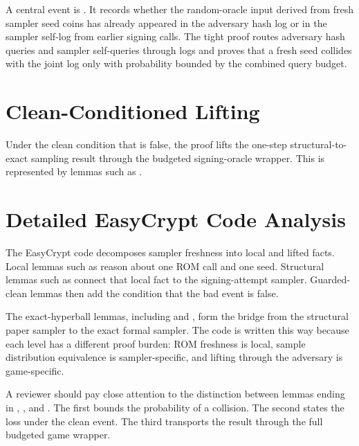 A central event is .  It records whether the
random-oracle input derived from fresh sampler seed coins has already appeared
in the adversary hash log or in the sampler self-log from earlier signing calls.
The tight proof routes adversary hash queries and sampler self-queries through
logs and proves that a fresh seed collides with the joint log only with
probability bounded by the combined query budget.

\section{Clean-Conditioned Lifting}

Under the clean condition that  is false, the
proof lifts the one-step structural-to-exact sampling result through the
budgeted signing-oracle wrapper.  This is represented by lemmas such as
.

\section{Detailed EasyCrypt Code Analysis}

The EasyCrypt code decomposes sampler freshness into local and lifted facts.
Local lemmas such as
 reason about
one ROM call and one seed.  Structural lemmas such as
connect that local fact to the signing-attempt sampler.  Guarded-clean lemmas
then add the condition that the bad event is false.

The exact-hyperball lemmas, including
 and
,
form the bridge from the structural paper sampler to the exact formal sampler.
The code is written this way because each level has a different proof burden:
ROM freshness is local, sample distribution equivalence is sampler-specific,
and lifting through the adversary is game-specific.

A reviewer should pay close attention to the distinction between lemmas ending
in , , and .
The first bounds the probability of a collision.  The second states the loss
under the clean event.  The third transports the result through the full
budgeted game wrapper.
